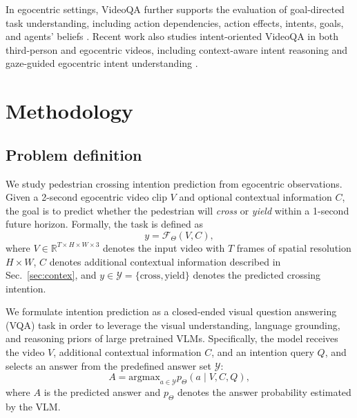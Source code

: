\documentclass[letterpaper, 10pt, journal]{IEEEtran}  %
\begin{document}
In egocentric settings, VideoQA further supports the evaluation of goal-directed task understanding, including action dependencies, action effects, intents, goals, and agents' beliefs \cite{jia2022egotaskqa}. Recent work also studies intent-oriented VideoQA in both third-person and egocentric videos, including context-aware intent reasoning and gaze-guided egocentric intent understanding \cite{li2023intentqa,peng2025eye}.




\section{Methodology}
\label{sec:methodology}

\subsection{Problem definition}

We study pedestrian crossing intention prediction from egocentric observations. Given a 2-second egocentric video clip $V$ and optional contextual information $C$, the goal is to predict whether the pedestrian will \emph{cross} or \emph{yield} within a 1-second future horizon. Formally, the task is defined as
\begin{equation}
    y = \mathcal{F}_{\Theta}(V, C),
\end{equation}
where $V \in \mathbb{R}^{T \times H \times W \times 3}$ denotes the input video with $T$ frames of spatial resolution $H \times W$, $C$ denotes additional contextual information described in Sec.~\ref{sec:contex}, and $y \in \mathcal{Y}=\{\text{cross}, \text{yield}\}$ denotes the predicted crossing intention.

We formulate intention prediction as a closed-ended visual question answering (VQA) task in order to leverage the visual understanding, language grounding, and reasoning priors of large pretrained VLMs. Specifically, the model receives the video $V$, additional contextual information $C$, and an intention query $Q$, and selects an answer from the predefined answer set $\mathcal{Y}$:
\begin{equation}
    A = \text{argmax}_{a \in \mathcal{Y}} p_{\Theta}(a \mid V, C, Q),
\end{equation}
where $A$ is the predicted answer and $p_{\Theta}$ denotes the answer probability estimated by the VLM.
\end{document}

